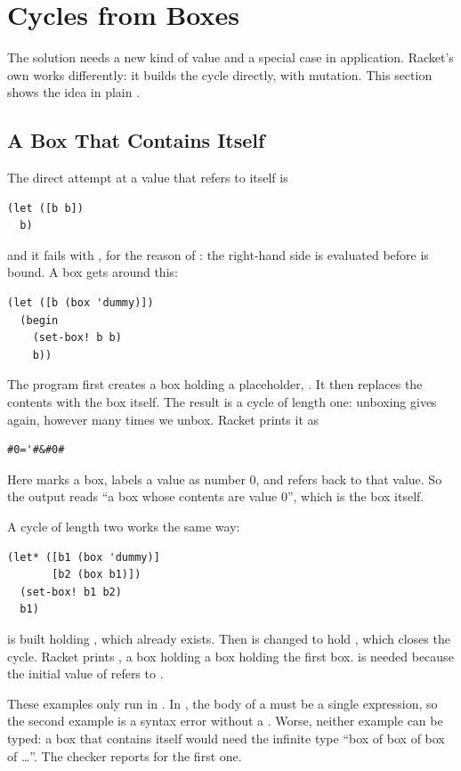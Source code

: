 \section{Cycles from Boxes}
\label{sec:cycles}

The  solution needs a new kind of value and a special case in application. Racket's own  works differently: it builds the cycle directly, with mutation. This section shows the idea in plain .

\subsection{A Box That Contains Itself}

The direct attempt at a value that refers to itself is
\begin{lstlisting}
(let ([b b])
  b)
\end{lstlisting}
and it fails with , for the reason of : the right-hand side is evaluated before  is bound. A box gets around this:
\begin{lstlisting}
(let ([b (box 'dummy)])
  (begin
    (set-box! b b)
    b))
\end{lstlisting}
The program first creates a box holding a placeholder, . It then replaces the contents with the box itself. The result is a cycle of length one: unboxing  gives  again, however many times we unbox. Racket prints it as
\begin{lstlisting}[style=repl]
#0='#&#0#
\end{lstlisting}
Here \code{\#\&} marks a box,  labels a value as number 0, and  refers back to that value. So the output reads ``a box whose contents are value 0'', which is the box itself.

A cycle of length two works the same way:
\begin{lstlisting}
(let* ([b1 (box 'dummy)]
       [b2 (box b1)])
  (set-box! b1 b2)
  b1)
\end{lstlisting}
 is built holding , which already exists. Then  is changed to hold , which closes the cycle. Racket prints , a box holding a box holding the first box.  is needed because the initial value of  refers to .

\begin{remark}
These examples only run in . In , the body of a  must be a single expression, so the second example is a syntax error without a . Worse, neither example can be typed: a box that contains itself would need the infinite type ``box of box of box of \dots''. The checker reports  for the first one.
\end{remark}

